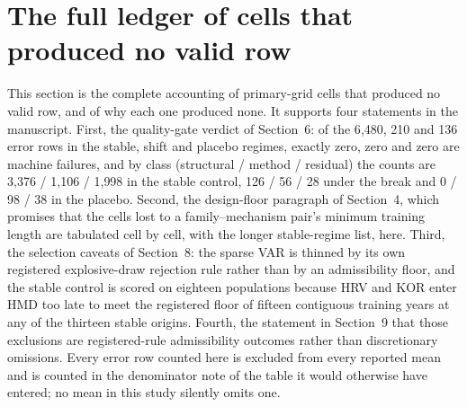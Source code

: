 %

\section{The full ledger of cells that produced no valid row}
\label{supp:infeasible}

This section is the complete accounting of primary-grid cells that produced no
valid row, and of why each one produced none. It supports four statements in the
manuscript. First, the quality-gate verdict of Section~6: of the 6{,}480, 210 and
136 error rows in the stable, shift and placebo regimes, exactly zero, zero and
zero are machine failures, and by class (structural / method / residual) the
counts are 3{,}376 / 1{,}106 / 1{,}998 in the stable control, 126 / 56 / 28 under
the break and 0 / 98 / 38 in the placebo. Second, the design-floor paragraph of
Section~4, which promises that the cells lost to a family--mechanism pair's
minimum training length are tabulated cell by cell, with the longer
stable-regime list, here. Third, the selection caveats of Section~8: the sparse
VAR is thinned by its own registered explosive-draw rejection rule rather than by
an admissibility floor, and the stable control is scored on eighteen populations
because HRV and KOR enter HMD too late to meet the registered floor of fifteen
contiguous training years at any of the thirteen stable origins. Fourth, the
statement in Section~9 that those exclusions are registered-rule admissibility
outcomes rather than discretionary omissions. Every error row counted here is
excluded from every reported mean and is counted in the denominator note of the
table it would otherwise have entered; no mean in this study silently omits one.

